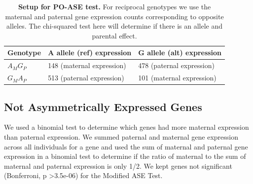 \begin{table}[!htb]
\centering
\begin{tabular}{@{}p{3cm}|p{5cm}p{5cm}@{}}
 \toprule  Genotype & A allele (ref) expression & G allele (alt) expression \\ \midrule
 $A_{M}G_{P}$ & 148  (maternal expression) & 478 (paternal expression) \\
 $G_{M}A_{P}$ & 513 (paternal expression) & 101 (maternal expression) \\
 \bottomrule
\end{tabular}
\caption[Setup for PO-ASE test.]{\textbf{Setup for PO-ASE test.} For reciprocal genotypes we use the maternal and paternal gene expression counts corresponding to opposite alleles. The chi-squared test here will determine if there is an allele and parental effect.}
\label{tab:chi}
\end{table}



\subsection{Not Asymmetrically Expressed Genes}\label{Not Asymmetrically Expressed Genes}
We used a binomial test to determine which genes had more maternal expression than paternal expression. We summed paternal and maternal gene expression across all individuals for a gene and used the sum of maternal and paternal gene expression in a binomial test to determine if the ratio of maternal to the sum of maternal and paternal expression is only 1/2. We kept genes not significant (Bonferroni, p \textgreater 3.5e-06) for the Modified ASE Test. 




